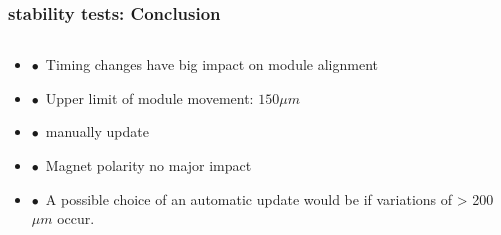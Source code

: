 \documentclass[xcolor=dvipsnames, aspectratio=1610, 12pt]{beamer}
\begin{document}
\begin{frame}\frametitle{stability tests: Conclusion}
  \begin{columns}
    \begin{column}[c]{\textwidth}
      \begin{itemize}
        \item $\bullet$\, Timing changes have big impact on module alignment
        \item $\bullet$\, Upper limit of module movement: $150 \mu m$ %
        \item $\bullet$\, \to manually update
        \item $\bullet$\, Magnet polarity no major impact
        \item $\bullet$\, A possible choice of an automatic update would be if variations of > 200 $\mu m$ occur.
      \end{itemize}
    \end{column}
  \end{columns}
\end{frame}

%         
\end{document}
